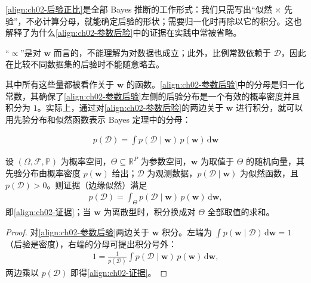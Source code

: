\documentclass[../../main.tex]{subfiles}
\begin{document}
\begin{remark}
\eqref{align:ch02-后验正比}是全部 Bayes 推断的工作形式：我们只需写出“似然 × 先验”，不必计算分母，就能确定后验的形状；需要归一化时再除以它的积分。这也解释了为什么\eqref{align:ch02-参数后验}中的证据在实践中常被省略。

“$\propto$”是对 $\mathbf{w}$ 而言的，不能理解为对数据也成立；此外，比例常数依赖于 $\mathcal{D}$，因此在比较不同数据集的后验时不能随意略去。
\end{remark}

其中所有这些量都被看作关于 $\mathbf{w}$ 的函数。\eqref{align:ch02-参数后验}中的分母是归一化常数，其确保了\eqref{align:ch02-参数后验}左侧的后验分布是一个有效的概率密度并且积分为 $1$。实际上，通过对\eqref{align:ch02-参数后验}的两边关于 $\mathbf{w}$ 进行积分，就可以用先验分布和似然函数表示 Bayes 定理中的分母：

\begin{align}
  p(\mathcal{D}) = \int p(\mathcal{D}\mid\mathbf{w})\,p(\mathbf{w})\,\mathrm{d}\mathbf{w}
  \label{align:ch02-证据}
\end{align}

\begin{proposition}[证据的边缘化表示]\label{proposition:ch02-证据}
设 $(\Omega,\mathcal{F},\mathbb{P})$ 为概率空间，$\Theta\subseteq\mathbb{R}^{P}$ 为参数空间，$\mathbf{w}$ 为取值于 $\Theta$ 的随机向量，其先验分布由概率密度 $p(\mathbf{w})$ 给出；$\mathcal{D}$ 为观测数据，$p(\mathcal{D}\mid\mathbf{w})$ 为似然函数，且 $p(\mathcal{D})>0$。则证据（边缘似然）满足
\begin{align*}
  p(\mathcal{D})=\int_{\Theta}p(\mathcal{D}\mid\mathbf{w})\,p(\mathbf{w})\,\mathrm{d}\mathbf{w},
\end{align*}
即\eqref{align:ch02-证据}；当 $\mathbf{w}$ 为离散型时，积分换成对 $\Theta$ 全部取值的求和。
\end{proposition}

\begin{proof}
对\eqref{align:ch02-参数后验}两边关于 $\mathbf{w}$ 积分。左端为 $\int p(\mathbf{w}\mid\mathcal{D})\,\mathrm{d}\mathbf{w}=1$（后验是密度），右端的分母可提出积分号外：
\begin{align*}
  1 = \frac{1}{p(\mathcal{D})}\int p(\mathcal{D}\mid\mathbf{w})\,p(\mathbf{w})\,\mathrm{d}\mathbf{w} ,
\end{align*}
两边乘以 $p(\mathcal{D})$ 即得\eqref{align:ch02-证据}。
\end{proof}
\end{document}
